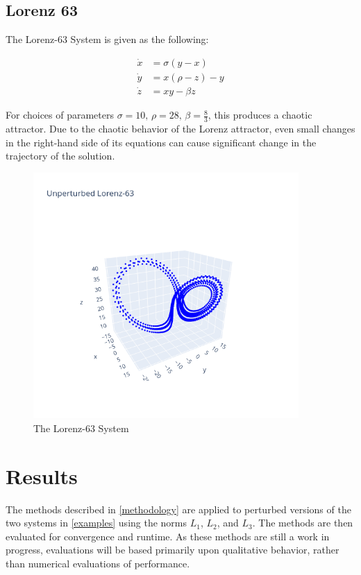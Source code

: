 \documentclass[12pt]{article}
\begin{document}
\subsection{Lorenz 63}

The Lorenz-63 System is given as the following:

\begin{align*}
  \dot{x} &= \sigma (y - x)\\
  \dot{y} &= x ( \rho - z ) - y\\
  \dot{z} &= x y - \beta z
\end{align*}

For choices of parameters $\sigma=10,\, \rho=28,\, \beta=\frac{8}{3}$, this produces a chaotic attractor. Due to the chaotic behavior of the Lorenz attractor, even small changes in the right-hand side of its equations can cause significant change in the trajectory of the solution.

\begin{figure}[ht]
  \centering
  \includegraphics[width=0.9\textwidth]{lorenz-unperturbed.png}
  \caption{The Lorenz-63 System}
\end{figure}




\section{Results}

The methods described in \ref{methodology} are applied to perturbed versions of the two systems in \ref{examples} using the norms $L_1$, $L_2$, and $L_3$. The methods are then evaluated for convergence and runtime. As these methods are still a work in progress, evaluations will be based primarily upon qualitative behavior, rather than numerical evaluations of performance.
\end{document}
